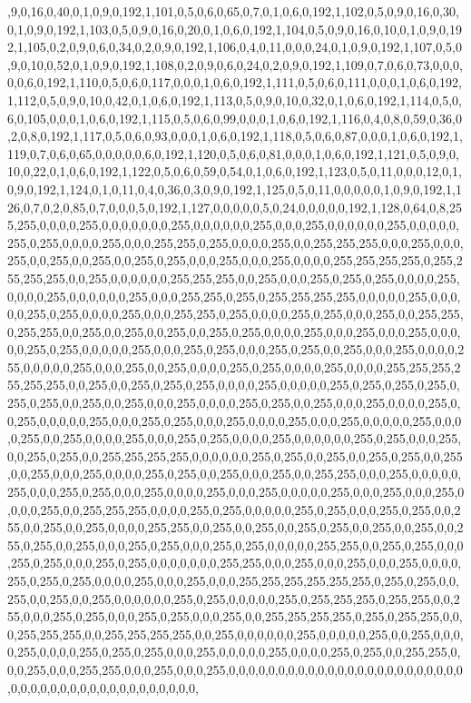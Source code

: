 ,9,0,16,0,40,0,1,0,9,0,192,1,101,0,5,0,6,0,65,0,7,0,1,0,6,0,192,1,102,0,5,0,9,0,16,0,30,0,1,0,9,0,192,1,103,0,5,0,9,0,16,0,20,0,1,0,6,0,192,1,104,0,5,0,9,0,16,0,10,0,1,0,9,0,192,1,105,0,2,0,9,0,6,0,34,0,2,0,9,0,192,1,106,0,4,0,11,0,0,0,24,0,1,0,9,0,192,1,107,0,5,0,9,0,10,0,52,0,1,0,9,0,192,1,108,0,2,0,9,0,6,0,24,0,2,0,9,0,192,1,109,0,7,0,6,0,73,0,0,0,0,0,6,0,192,1,110,0,5,0,6,0,117,0,0,0,1,0,6,0,192,1,111,0,5,0,6,0,111,0,0,0,1,0,6,0,192,1,112,0,5,0,9,0,10,0,42,0,1,0,6,0,192,1,113,0,5,0,9,0,10,0,32,0,1,0,6,0,192,1,114,0,5,0,6,0,105,0,0,0,1,0,6,0,192,1,115,0,5,0,6,0,99,0,0,0,1,0,6,0,192,1,116,0,4,0,8,0,59,0,36,0,2,0,8,0,192,1,117,0,5,0,6,0,93,0,0,0,1,0,6,0,192,1,118,0,5,0,6,0,87,0,0,0,1,0,6,0,192,1,119,0,7,0,6,0,65,0,0,0,0,0,6,0,192,1,120,0,5,0,6,0,81,0,0,0,1,0,6,0,192,1,121,0,5,0,9,0,10,0,22,0,1,0,6,0,192,1,122,0,5,0,6,0,59,0,54,0,1,0,6,0,192,1,123,0,5,0,11,0,0,0,12,0,1,0,9,0,192,1,124,0,1,0,11,0,4,0,36,0,3,0,9,0,192,1,125,0,5,0,11,0,0,0,0,0,1,0,9,0,192,1,126,0,7,0,2,0,85,0,7,0,0,0,5,0,192,1,127,0,0,0,0,0,5,0,24,0,0,0,0,0,192,1,128,0,64,0,8,255,255,0,0,0,0,255,0,0,0,0,0,0,0,255,0,0,0,0,0,0,255,0,0,0,255,0,0,0,0,0,0,255,0,0,0,0,0,255,0,255,0,0,0,0,255,0,0,0,255,255,0,255,0,0,0,0,255,0,0,255,255,255,0,0,0,255,0,0,0,255,0,0,255,0,0,255,0,0,255,0,255,0,0,0,255,0,0,0,255,0,0,0,0,255,255,255,255,0,255,255,255,255,0,0,255,0,0,0,0,0,0,255,255,255,0,0,255,0,0,0,255,0,255,0,255,0,0,0,0,255,0,0,0,0,255,0,0,0,0,0,0,255,0,0,0,255,255,0,255,0,255,255,255,255,0,0,0,0,0,255,0,0,0,0,0,255,0,255,0,0,0,0,255,0,0,0,255,255,0,255,0,0,0,0,255,0,255,0,0,0,255,0,0,255,255,0,255,255,0,0,255,0,0,255,0,0,255,0,0,255,0,255,0,0,0,0,255,0,0,0,255,0,0,0,255,0,0,0,0,0,255,0,255,0,0,0,0,0,255,0,0,0,255,0,255,0,0,0,255,0,255,0,0,255,0,0,0,255,0,0,0,0,255,0,0,0,0,0,255,0,0,0,255,0,0,255,0,0,0,0,255,0,255,0,0,0,0,255,0,0,0,0,255,255,255,255,255,255,0,0,255,0,0,255,0,255,0,255,0,0,0,0,255,0,0,0,0,0,255,0,255,0,255,0,255,0,255,0,255,0,0,255,0,0,255,0,0,0,255,0,0,0,0,255,0,255,0,0,255,0,0,0,255,0,0,0,0,255,0,0,255,0,0,0,0,0,255,0,0,0,255,0,255,0,0,0,255,0,0,0,0,255,0,0,0,255,0,0,0,0,0,255,0,0,0,0,255,0,0,255,0,0,0,0,255,0,0,0,255,0,255,0,0,0,0,255,0,0,0,0,0,0,255,0,255,0,0,0,255,0,0,255,0,255,0,0,255,255,255,255,0,0,0,0,0,0,255,0,255,0,0,255,0,0,255,0,255,0,0,255,0,0,255,0,0,0,255,0,0,0,0,255,0,255,0,0,255,0,0,0,255,0,0,255,255,0,0,0,255,0,0,0,0,0,255,0,0,0,255,0,255,0,0,0,255,0,0,0,0,255,0,0,0,255,0,0,0,0,0,255,0,0,0,255,0,0,0,255,0,0,0,0,255,0,0,255,255,255,0,0,0,0,255,0,255,0,0,0,0,0,255,0,255,0,0,0,255,0,255,0,0,255,0,0,255,0,0,255,0,0,0,0,255,255,0,0,255,0,0,255,0,0,255,0,255,0,0,255,0,0,255,0,0,255,0,255,0,0,255,0,0,0,255,0,255,0,0,0,255,0,255,0,0,0,0,0,255,255,0,0,255,0,255,0,0,0,255,0,255,0,0,0,255,0,255,0,0,0,0,0,0,0,255,255,0,0,0,255,0,0,0,255,0,0,0,255,0,0,0,0,255,0,255,0,255,0,0,0,0,255,0,0,0,255,0,0,0,255,255,255,255,255,255,0,255,0,255,0,0,255,0,0,255,0,0,255,0,0,0,0,0,0,255,0,255,0,0,0,0,0,255,0,255,255,255,0,255,255,0,0,255,0,0,0,255,0,255,0,0,0,255,0,255,0,0,0,255,0,0,255,255,255,255,0,255,0,255,255,0,0,0,255,255,255,0,0,255,255,255,255,0,0,255,0,0,0,0,0,0,255,0,0,0,0,0,255,0,0,255,0,0,0,0,255,0,0,0,0,255,0,255,0,255,0,0,0,255,0,0,0,0,0,255,0,0,0,0,255,0,255,0,0,255,255,0,0,0,255,0,0,0,255,255,0,0,0,255,0,0,0,255,0,0,0,0,0,0,0,0,0,0,0,0,0,0,0,0,0,0,0,0,0,0,0,0,0,0,0,0,0,0,0,0,0,0,0,0,0,0,0,0,0,0,0,
